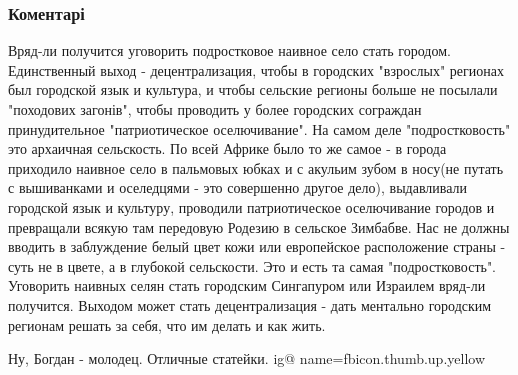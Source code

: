  
 
 
 
 
\subsubsection{Коментарі}

\begin{itemize}
 

Вряд-ли получится уговорить подростковое наивное село стать городом.
Единственный выход - децентрализация, чтобы в городских "взрослых" регионах был
городской язык и культура, и чтобы сельские регионы больше не посылали
"походових загонів", чтобы проводить у более городских сограждан принудительное
"патриотическое оселючивание". На самом деле "подростковость" это архаичная
сельскость. По всей Африке было то же самое - в города приходило наивное село в
пальмовых юбках и с акульим зубом в носу(не путать с вышиванками и оселедцями -
это совершенно другое дело), выдавливали городской язык и культуру, проводили
патриотическое оселючивание городов и превращали всякую там передовую Родезию в
сельское Зимбабве. Нас не должны вводить в заблуждение белый цвет кожи или
европейское расположение страны - суть не в цвете, а в глубокой сельскости. Это
и есть та самая "подростковость". Уговорить наивных селян стать городским
Сингапуром или Израилем вряд-ли получится. Выходом может стать децентрализация
- дать ментально городским регионам решать за себя, что им делать и как жить.


 
Ну, Богдан - молодец. Отличные статейки.
\ifcmt
  ig@ name=fbicon.thumb.up.yellow
\fi


\end{itemize}

